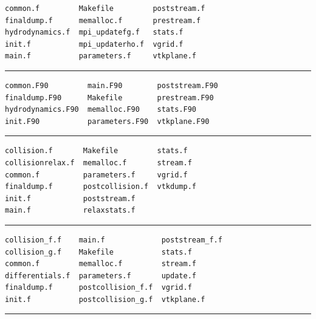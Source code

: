 \documentclass[12pt]{report}
\begin{document}

\begin{verbatim}
common.f         Makefile         poststream.f
finaldump.f      memalloc.f       prestream.f
hydrodynamics.f  mpi_updatefg.f   stats.f
init.f           mpi_updaterho.f  vgrid.f
main.f           parameters.f     vtkplane.f
\end{verbatim}
\hrule\vspace{1em}


\begin{verbatim}
common.F90         main.F90        poststream.F90
finaldump.F90      Makefile        prestream.F90
hydrodynamics.F90  memalloc.F90    stats.F90
init.F90           parameters.F90  vtkplane.F90
\end{verbatim}
\hrule\vspace{1em}


\begin{verbatim}
collision.f       Makefile         stats.f
collisionrelax.f  memalloc.f       stream.f
common.f          parameters.f     vgrid.f
finaldump.f       postcollision.f  vtkdump.f
init.f            poststream.f
main.f            relaxstats.f
\end{verbatim}
\hrule\vspace{1em}


\begin{verbatim}
collision_f.f    main.f             poststream_f.f
collision_g.f    Makefile           stats.f
common.f         memalloc.f         stream.f
differentials.f  parameters.f       update.f
finaldump.f      postcollision_f.f  vgrid.f
init.f           postcollision_g.f  vtkplane.f
\end{verbatim}
\hrule\vspace{1em}
\end{document}

